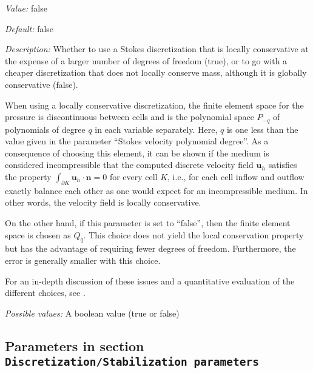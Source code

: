 \begin{itemize}
{\it Value:} false


{\it Default:} false


{\it Description:} Whether to use a Stokes discretization that is locally conservative at the expense of a larger number of degrees of freedom (true), or to go with a cheaper discretization that does not locally conserve mass, although it is globally conservative (false).

When using a locally conservative discretization, the finite element space for the pressure is discontinuous between cells and is the polynomial space $P_ {-q}$ of polynomials of degree $q$ in each variable separately. Here, $q$ is one less than the value given in the parameter ``Stokes velocity polynomial degree''. As a consequence of choosing this element, it can be shown if the medium is considered incompressible that the computed discrete velocity field $\mathbf u_h$ satisfies the property $\int_ {\partial K} \mathbf u_h \cdot \mathbf n = 0$ for every cell $K$, i.e., for each cell inflow and outflow exactly balance each other as one would expect for an incompressible medium. In other words, the velocity field is locally conservative.

On the other hand, if this parameter is set to ``false'', then the finite element space is chosen as $Q_q$. This choice does not yield the local conservation property but has the advantage of requiring fewer degrees of freedom. Furthermore, the error is generally smaller with this choice.

For an in-depth discussion of these issues and a quantitative evaluation of the different choices, see \cite {KHB12} .


{\it Possible values:} A boolean value (true or false)
\end{itemize}



\subsection{Parameters in section \tt Discretization/Stabilization parameters}
\label{parameters:Discretization/Stabilization_20parameters}

